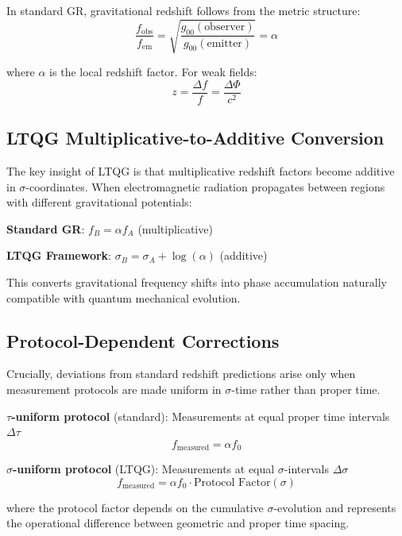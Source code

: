 \documentclass[12pt,a4paper]{article}
\begin{document}
In standard GR, gravitational redshift follows from the metric structure:
\begin{equation}
\frac{f_{\text{obs}}}{f_{\text{em}}} = \sqrt{\frac{g_{00}(\text{observer})}{g_{00}(\text{emitter})}} = \alpha
\end{equation}

where $\alpha$ is the local redshift factor. For weak fields:
\begin{equation}
z = \frac{\Delta f}{f} = \frac{\Delta \Phi}{c^2}
\end{equation}

\subsection{LTQG Multiplicative-to-Additive Conversion}

The key insight of LTQG is that multiplicative redshift factors become additive in $\sigma$-coordinates. When electromagnetic radiation propagates between regions with different gravitational potentials:

\textbf{Standard GR}: $f_B = \alpha f_A$ (multiplicative)

\textbf{LTQG Framework}: $\sigma_B = \sigma_A + \log(\alpha)$ (additive)

This converts gravitational frequency shifts into phase accumulation naturally compatible with quantum mechanical evolution.

\subsection{Protocol-Dependent Corrections}

Crucially, deviations from standard redshift predictions arise only when measurement protocols are made uniform in $\sigma$-time rather than proper time. 

\textbf{$\tau$-uniform protocol} (standard): Measurements at equal proper time intervals $\Delta \tau$
\begin{equation}
f_{\text{measured}} = \alpha f_0
\end{equation}

\textbf{$\sigma$-uniform protocol} (LTQG): Measurements at equal $\sigma$-intervals $\Delta \sigma$
\begin{equation}
f_{\text{measured}} = \alpha f_0 \cdot \text{Protocol Factor}(\sigma)
\end{equation}

where the protocol factor depends on the cumulative $\sigma$-evolution and represents the operational difference between geometric and proper time spacing.
\end{document}
